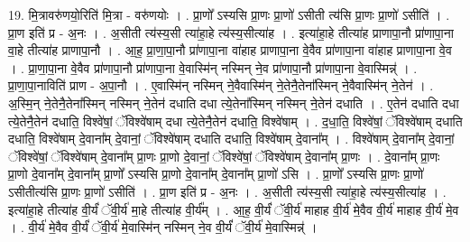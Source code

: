 \documentclass[17pt]{extarticle}
\begin{document}
19. मि॒त्रावरु॑णयो॒रिति॑ मि॒त्रा - वरु॑णयोः । . प्रा॒णो᳚ ऽस्यसि प्रा॒णः प्रा॒णो॑ ऽसीती त्य॑सि प्रा॒णः प्रा॒णो॑ ऽसीति॑ । . प्रा॒ण इति॑ प्र - अ॒नः । . अ॒सीती त्य॑स्य॒सी त्या॑हा॒हे त्य॑स्य॒सीत्या॑ह । . इत्या॑हा॒हे तीत्या॑ह प्राणापा॒नौ प्रा॑णापा॒ना वा॒हे तीत्या॑ह प्राणापा॒नौ । . आ॒ह॒ प्रा॒णा॒पा॒नौ प्रा॑णापा॒ना वा॑हाह प्राणापा॒ना वे॒वैव प्रा॑णापा॒ना वा॑हाह प्राणापा॒ना वे॒व । . प्रा॒णा॒पा॒ना वे॒वैव प्रा॑णापा॒नौ प्रा॑णापा॒ना वे॒वास्मि॑न् नस्मिन् ने॒व प्रा॑णापा॒नौ प्रा॑णापा॒ना वे॒वास्मिन्न्॑ । . प्रा॒णा॒पा॒नाविति॑ प्राण - अ॒पा॒नौ । . ए॒वास्मि॑न् नस्मिन् ने॒वैवास्मि॑न् ने॒तेनै॒तेना᳚स्मिन् ने॒वैवास्मि॑न् ने॒तेन॑ । . अ॒स्मि॒न् ने॒तेनै॒तेना᳚स्मिन् नस्मिन् ने॒तेन॑ दधाति दधा त्ये॒तेना᳚स्मिन् नस्मिन् ने॒तेन॑ दधाति । . ए॒तेन॑ दधाति दधा त्ये॒तेनै॒तेन॑ दधाति॒ विश्वे॑षां॒ ॅविश्वे॑षाम् दधा त्ये॒तेनै॒तेन॑ दधाति॒ विश्वे॑षाम् । . द॒धा॒ति॒ विश्वे॑षां॒ ॅविश्वे॑षाम् दधाति दधाति॒ विश्वे॑षाम् दे॒वाना᳚म् दे॒वानां॒ ॅविश्वे॑षाम् दधाति दधाति॒ विश्वे॑षाम् दे॒वाना᳚म् । . विश्वे॑षाम् दे॒वाना᳚म् दे॒वानां॒ ॅविश्वे॑षां॒ ॅविश्वे॑षाम् दे॒वाना᳚म् प्रा॒णः प्रा॒णो दे॒वानां॒ ॅविश्वे॑षां॒ ॅविश्वे॑षाम् दे॒वाना᳚म् प्रा॒णः । . दे॒वाना᳚म् प्रा॒णः प्रा॒णो दे॒वाना᳚म् दे॒वाना᳚म् प्रा॒णो᳚ ऽस्यसि प्रा॒णो दे॒वाना᳚म् दे॒वाना᳚म् प्रा॒णो॑ ऽसि । . प्रा॒णो᳚ ऽस्यसि प्रा॒णः प्रा॒णो॑ ऽसीतीत्य॑सि प्रा॒णः प्रा॒णो॑ ऽसीति॑ । . प्रा॒ण इति॑ प्र - अ॒नः । . अ॒सीती त्य॑स्य॒सी त्या॑हा॒हे त्य॑स्य॒सीत्या॑ह । . इत्या॑हा॒हे तीत्या॑ह वी॒र्यं॑ ॅवी॒र्य॑ मा॒हे तीत्या॑ह वी॒र्य᳚म् । . आ॒ह॒ वी॒र्यं॑ ॅवी॒र्य॑ माहाह वी॒र्य॑ मे॒वैव वी॒र्य॑ माहाह वी॒र्य॑ मे॒व । . वी॒र्य॑ मे॒वैव वी॒र्यं॑ ॅवी॒र्य॑ मे॒वास्मि॑न् नस्मिन् ने॒व वी॒र्यं॑ ॅवी॒र्य॑ मे॒वास्मिन्न्॑ । \newline
\end{document}
